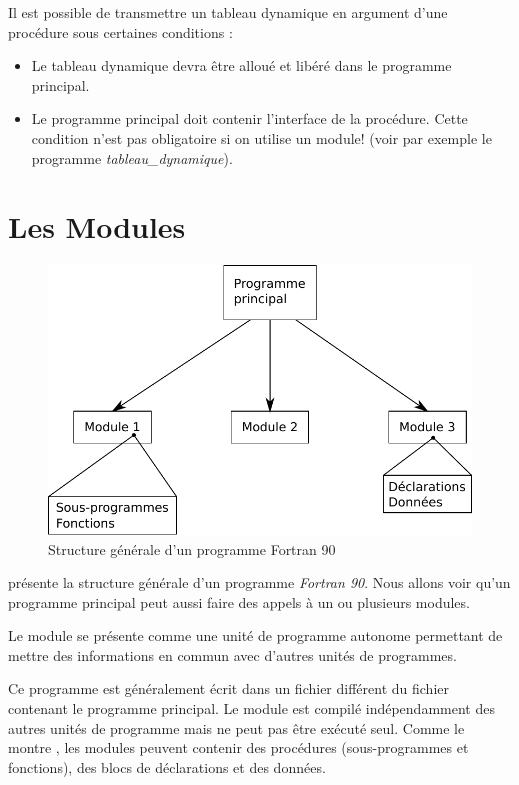\documentclass[a4paper,twoside]{article}
\begin{document}
\bigskip

Il est possible de transmettre un tableau dynamique en argument d'une procédure sous certaines conditions : 
\begin{itemize}
\item Le tableau dynamique devra être alloué et libéré dans le programme principal. 
\item Le programme principal doit contenir l'interface de la procédure. Cette condition n'est pas obligatoire si on utilise un module! (voir par exemple le programme \emph{tableau\_dynamique}).
\end{itemize}

\section{Les Modules}

\begin{figure}[htb]
\centering
\includegraphics[width=0.65\linewidth]{figure/structure_programme.pdf}
\caption{Structure générale d'un programme Fortran 90}\label{fig:structure_programme}
\end{figure}

 présente la structure générale d'un programme \emph{Fortran 90}. Nous allons voir qu'un programme principal peut aussi faire des appels à un ou plusieurs modules. 

\begin{definition}
Le module se présente comme une unité de programme autonome permettant de mettre des informations en commun avec d'autres unités de programmes. 
\end{definition}


Ce programme est généralement écrit dans un fichier différent du fichier contenant le programme principal. Le module est compilé indépendamment des autres unités de programme mais ne peut pas être exécuté seul. Comme le montre , les modules peuvent contenir des procédures (sous-programmes et fonctions), des blocs de déclarations et des données. 
\end{document}
